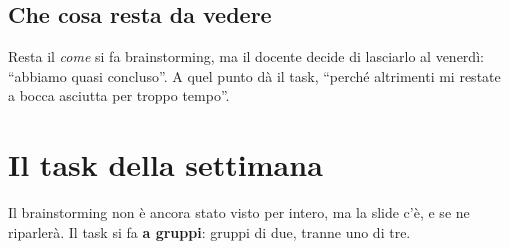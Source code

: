 \subsection{Che cosa resta da vedere}

Resta il \emph{come} si fa brainstorming, ma il docente decide di lasciarlo
al venerdì: ``abbiamo quasi concluso''. A quel punto dà il task, ``perché
altrimenti mi restate a bocca asciutta per troppo tempo''.

\section{Il task della settimana}
\label{sec:task-gd5}

Il brainstorming non è ancora stato visto per intero, ma la slide c'è, e se ne
riparlerà. Il task si fa \textbf{a gruppi}: gruppi di due, tranne uno di tre.

